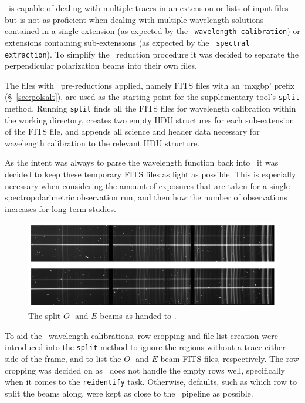 \iraf\ is capable of dealing with multiple traces in an extension or lists of input files but is not as proficient when dealing with multiple wavelength solutions contained in a single extension (as expected by the \polsalt\ \texttt{wavelength calibration}) or extensions containing sub-extensions (as expected by the \polsalt\ \texttt{spectral extraction}). To simplify the \iraf\ reduction procedure it was decided to separate the perpendicular polarization beams into their own files.

The files with \polsalt\ pre-reductions applied, namely \gls{FITS} files with an `mxgbp' prefix (\S~\ref{sec:polsalt}), are used as the starting point for the supplementary tool's \texttt{split} method. Running \texttt{split} finds all the \gls{FITS} files for wavelength calibration within the working directory, creates two empty \gls{HDU} structures for each sub-extension of the \gls{FITS} file, and appends all science and header data necessary for wavelength calibration to the relevant \gls{HDU} structure.

As the intent was always to parse the wavelength function back into \polsalt\ it was decided to keep these temporary \gls{FITS} files as light as possible. This is especially necessary when considering the amount of exposures that are taken for a single spectropolarimetric observation run, and then how the number of observations increases for long term studies.

\begin{figure}[t]
    \centering
    \includegraphics[width = 1.0\textwidth]{figures/3_OEsplit.pdf}
    \caption{The split $O$- and $E$-beams as handed to \iraf.}
    \label{fig:OE_split}
\end{figure}

To aid the \iraf\ wavelength calibrations, row cropping and file list creation were introduced into the \texttt{split} method to ignore the regions without a trace either side of the frame, and to list the $O$- and $E$-beam \gls{FITS} files, respectively. The row cropping was decided on as \iraf\ does not handle the empty rows well, specifically when it comes to the \texttt{reidentify} task. Otherwise, defaults, such as which row to split the beams along, were kept as close to the \polsalt\ pipeline as possible.

